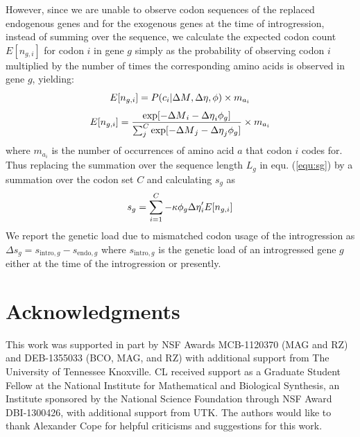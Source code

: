 \documentclass[fleqn,letterpaper]{article}
\newcommand\suppl{\par
  \setcounter{section}{0}%
  \setcounter{subsection}{0}%
  \setcounter{table}{0}%
  \setcounter{figure}{0}%
  \setcounter{equation}{0}%
  \gdef\thesection{\Alph{section}.1}%
  \def\thefigure{\Alph{section}\arabic{figure}}%
  \def\thetable{\Alph{section}\arabic{table}}%
  \def\theequation {\Alph{section}\arabic{equation}}}
\begin{document}
However, since we are unable to observe codon sequences of the replaced endogenous genes and for the exogenous genes at the time of introgression, instead of summing over the sequence, we calculate the expected codon count $E[n_{g,i}] $ for codon $i$ in gene $g$ simply as the probability of observing codon $i$ multiplied by the number of times the corresponding amino acids is observed in gene $g$, yielding:
\begin{equation}
E[n_{g,i}] = P(c_i | {\Delta M}, {\Delta \eta}, \phi) \times m_{a_i}
\end{equation}
\begin{equation}
E[n_{g,i}] = \frac{\exp[-{\Delta M}_i -{\Delta \eta}_i\phi_g]}{\sum_j^C \exp[-{\Delta M}_j -{\Delta \eta}_j\phi_g]}\times m_{a_i}
\end{equation} 
where $m_{a_i}$ is the number of occurrences of amino acid $a$ that codon $i$ codes for.
Thus replacing the summation over the sequence length $L_g$ in equ. (\ref{equ:sg}) by a summation over the codon set $C$ and calculating $s_g$ as
\begin{equation}
s_g = \sum_{i=1}^{C} -\kappa \phi_g {\Delta \eta}'_i E[n_{g,i}] 
\end{equation}
We report the genetic load due to mismatched codon usage of the introgression as $\Delta s_g = s_{\text{intro},g} - s_{\text{endo},g}$ where $s_{\text{intro},g}$ is the genetic load of an introgressed gene $g$ either at the time of the introgression or presently.

\section*{Acknowledgments}

This work was supported in part by NSF Awards MCB-1120370 (MAG and RZ) and DEB-1355033 (BCO, MAG, and RZ) with additional support from The University of Tennessee Knoxville. 
CL received support as a Graduate Student Fellow at the National Institute for Mathematical and Biological Synthesis, an Institute sponsored by the National Science Foundation through NSF Award DBI-1300426, with additional support from UTK. 
The authors would like to thank Alexander Cope for helpful criticisms and suggestions for this work.






\clearpage
\pagebreak



\suppl

\setcounter{section}{19} %
\setcounter{page}{1}
\renewcommand{\thepage}{S\arabic{page}} %
\end{document}
